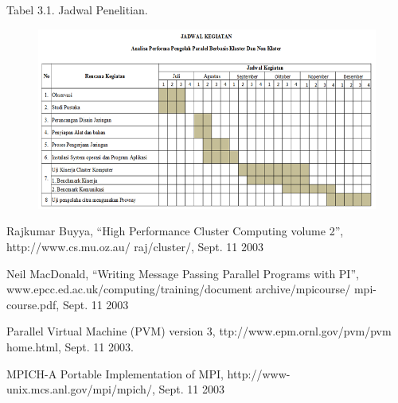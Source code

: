 \documentclass{jtetiproposalskripsi}
\begin{document}
\begin{center}
Tabel 3.1. Jadwal Penelitian.
\end{center}
\vspace{-0.5cm}
\begin{figure}[ht!]
  \centering
    \includegraphics[width=13cm]{gambar/jadwal}
\end{figure}


\begin{thebibliography}{9}

Rajkumar Buyya, “High Performance Cluster Computing volume 2”, http://www.cs.mu.oz.au/ raj/cluster/,  Sept. 11 2003

Neil MacDonald, “Writing Message Passing Parallel Programs with PI”, 
www.epcc.ed.ac.uk/computing/training/document archive/mpicourse/ mpi-course.pdf, Sept. 11 2003 


Parallel Virtual Machine (PVM) version 3, ttp://www.epm.ornl.gov/pvm/pvm home.html, Sept. 11 2003.

MPICH-A Portable Implementation of MPI, http://www-unix.mcs.anl.gov/mpi/mpich/, Sept. 11 2003


\end{thebibliography}
\end{document}
